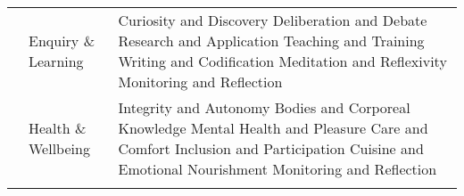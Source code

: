 \begin{table}[th]
\begin{center}
\begin{tabular}{ >{\raggedright\arraybackslash}p{} >{\raggedright\arraybackslash}p{} >{\raggedright\arraybackslash}p{} }
  & Enquiry \& Learning & Curiosity and Discovery \linebreak Deliberation and Debate \linebreak Research and Application \linebreak Teaching and Training \linebreak Writing and Codification \linebreak Meditation and Reflexivity \linebreak Monitoring and Reflection \linebreak \\
  & Health \& Wellbeing & Integrity and Autonomy \linebreak Bodies and Corporeal Knowledge \linebreak Mental Health and Pleasure \linebreak Care and Comfort \linebreak Inclusion and Participation \linebreak Cuisine and Emotional Nourishment \linebreak Monitoring and Reflection \\
\hline
\label{tbl:incomesByUfarmens4}
\end{tabular}
\end{center}
\end{table}

